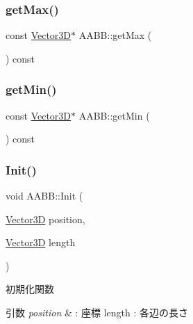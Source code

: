 \subsubsection{\texorpdfstring{get\+Max()}{getMax()}}
{\footnotesize\ttfamily const \mbox{\hyperlink{class_vector3_d}{Vector3D}}$\ast$ A\+A\+B\+B\+::get\+Max (\begin{DoxyParamCaption}{ }\end{DoxyParamCaption}) const\hspace{0.3cm}{\ttfamily [inline]}}

\mbox{\label{class_a_a_b_b_a9a18cef6c33dd579c144700c79ea39f5}} 
\subsubsection{\texorpdfstring{get\+Min()}{getMin()}}
{\footnotesize\ttfamily const \mbox{\hyperlink{class_vector3_d}{Vector3D}}$\ast$ A\+A\+B\+B\+::get\+Min (\begin{DoxyParamCaption}{ }\end{DoxyParamCaption}) const\hspace{0.3cm}{\ttfamily [inline]}}

\mbox{\label{class_a_a_b_b_a28167704c3b21de2ae9f70ac139781c4}} 
\subsubsection{\texorpdfstring{Init()}{Init()}}
{\footnotesize\ttfamily void A\+A\+B\+B\+::\+Init (\begin{DoxyParamCaption}\item[{\mbox{\hyperlink{class_vector3_d}{Vector3D}}}]{position,  }\item[{\mbox{\hyperlink{class_vector3_d}{Vector3D}}}]{length }\end{DoxyParamCaption})\hspace{0.3cm}{\ttfamily [inline]}}



初期化関数 


\begin{DoxyParams}{引数}
{\em position} & \+: 座標 length \+: 各辺の長さ \\
\hline
\end{DoxyParams}
\mbox{\label{class_a_a_b_b_a76816b1eb872408d91dfa6880e5af109}} 
